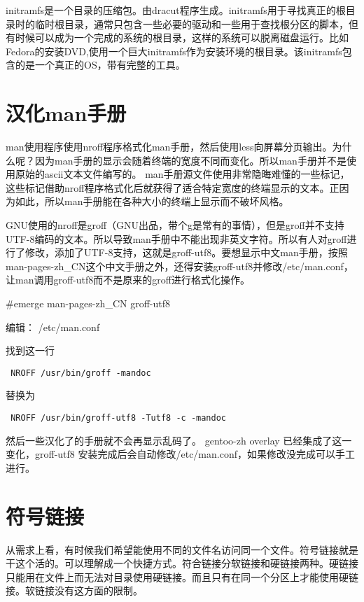 initramfs是一个目录的压缩包。由dracut程序生成。initramfs用于寻找真正的根目录时的临时根目录，通常只包含一些必要的驱动和一些用于查找根分区的脚本，但有时候可以成为一个完成的系统的根目录，这样的系统可以脱离磁盘运行。比如Fedora的安装DVD,使用一个巨大initramfs作为安装环境的根目录。该initramfs包含的是一个真正的OS，带有完整的工具。


\section{汉化man手册}\label{FAQ:zhman}

man使用程序使用nroff程序格式化man手册，然后使用less向屏幕分页输出。为什么呢？因为man手册的显示会随着终端的宽度不同而变化。所以man手册并不是使用原始的ascii文本文件编写的。
man手册源文件使用非常隐晦难懂的一些标记，这些标记借助nroff程序格式化后就获得了适合特定宽度的终端显示的文本。正因为如此，所以man手册能在各种大小的终端上显示而不破坏风格。

GNU使用的nroff是groff（GNU出品，带个g是常有的事情），但是groff并不支持UTF-8编码的文本。所以导致man手册中不能出现非英文字符。所以有人对groff进行了修改，添加了UTF-8支持，这就是groff-utf8。要想显示中文man手册，按照man-pages-zh\_CN这个中文手册之外，还得安装groff-utf8并修改/etc/man.conf，让man调用groff-utf8而不是原来的groff进行格式化操作。

\begin{code}
\#emerge man-pages-zh\_CN groff-utf8
\end{code}

编辑： /etc/man.conf 

找到这一行

{
\tt
NROFF           /usr/bin/groff -mandoc
}

替换为

{ \tt
NROFF           /usr/bin/groff-utf8 -Tutf8 -c -mandoc
}

然后一些汉化了的手册就不会再显示乱码了。
gentoo-zh overlay 已经集成了这一变化，groff-utf8 安装完成后会自动修改/etc/man.conf，如果修改没完成可以手工进行。

\section{符号链接}\label{faq:symlink}

从需求上看，有时候我们希望能使用不同的文件名访问同一个文件。符号链接就是干这个活的。可以理解成一个快捷方式。符合链接分软链接和硬链接两种。硬链接只能用在文件上而无法对目录使用硬链接。而且只有在同一个分区上才能使用硬链接。软链接没有这方面的限制。

